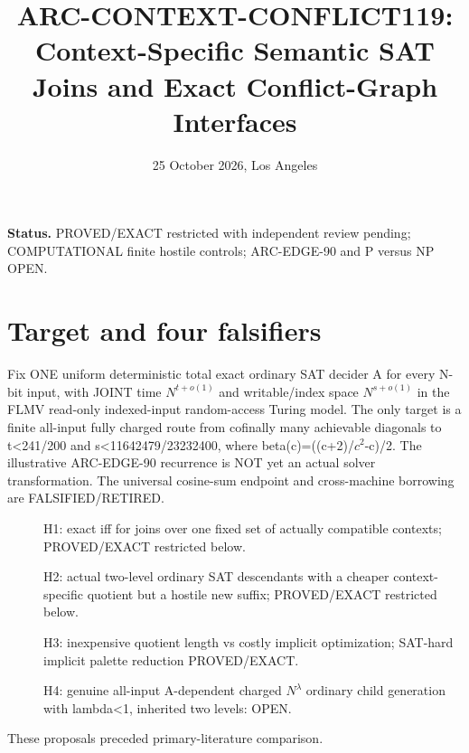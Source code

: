 \documentclass[11pt]{article}
\title{ARC-CONTEXT-CONFLICT119: Context-Specific Semantic SAT Joins and Exact Conflict-Graph Interfaces}
\date{25 October 2026, Los Angeles}
\begin{document}
\maketitle
\noindent\textbf{Status.} PROVED/EXACT restricted with independent review pending; COMPUTATIONAL finite hostile controls; ARC-EDGE-90 and P versus NP OPEN.
\section{Target and four falsifiers}
Fix ONE uniform deterministic total exact ordinary SAT decider A for every N-bit input, with JOINT time \(N^{t+o(1)}\) and writable/index space \(N^{s+o(1)}\) in the FLMV read-only indexed-input random-access Turing model.
The only target is a finite all-input fully charged route from cofinally many achievable diagonals to t<241/200 and s<11642479/23232400, where beta(c)=((c+2)/\(c^2\)-c)/2.
The illustrative ARC-EDGE-90 recurrence is NOT yet an actual solver transformation.
The universal cosine-sum endpoint and cross-machine borrowing are FALSIFIED/RETIRED.
\begin{description}
\item[] H1: exact iff for joins over one fixed set of actually compatible contexts; PROVED/EXACT restricted below.
\item[] H2: actual two-level ordinary SAT descendants with a cheaper context-specific quotient but a hostile new suffix; PROVED/EXACT restricted below.
\item[] H3: inexpensive quotient length vs costly implicit optimization; SAT-hard implicit palette reduction PROVED/EXACT.
\item[] H4: genuine all-input A-dependent charged \(N^\lambda\) ordinary child generation with lambda<1, inherited two levels: OPEN.
\end{description}
These proposals preceded primary-literature comparison.
\end{document}
